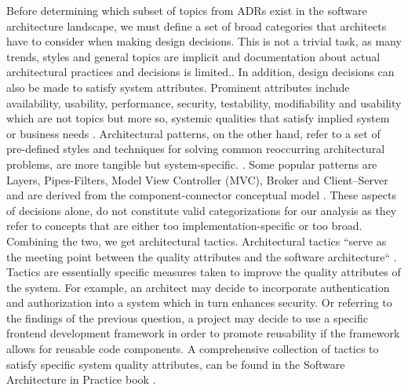         Before determining which subset of topics from ADRs exist in the software architecture landscape, we must define a set of broad categories that architects have to consider when making design decisions. This is not a trivial task, as many trends, styles and general topics are implicit and documentation about actual architectural practices and decisions is limited.\cite{arch_patterns_in_practice_TOPICS}. In addition, design decisions can also be made to satisfy system attributes. Prominent attributes include availability, usability, performance, security, testability, modifiability and usability which are not topics but more so, systemic qualities that satisfy implied system or business needs \cite{patters+quality_requirements+tactics}. Architectural patterns, on the other hand, refer to a set of pre-defined styles and techniques for solving common reoccurring architectural problems, are more tangible but system-specific. \cite{Patterns+ArchDecisions}. Some popular patterns are Layers, Pipes-Filters, Model View Controller (MVC), Broker and Client–Server and are derived from the component-connector conceptual model \cite{survey_arch_patterns}. These aspects of decisions alone, do not constitute valid categorizations for our analysis as they refer to concepts that are either too implementation-specific or too broad. Combining the two, we get architectural tactics. Architectural tactics ``serve as the
        meeting point between the quality attributes and the software architecture`` \cite{patters+quality_requirements+tactics}. Tactics are essentially specific measures taken to improve the quality attributes of the system. For example, an architect may decide to incorporate authentication and authorization into a system which in turn enhances security. Or referring to the findings of the previous question, a project may decide to use a specific frontend development framework in order to promote reusability if the framework allows for reusable code components. A comprehensive collection of tactics to satisfy specific system quality attributes, can be found in the Software Architecture in Practice book \cite{software_arch_in_practice_book}. 
